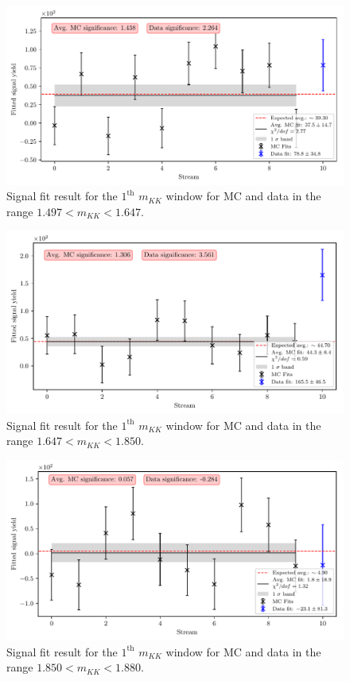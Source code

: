 \begin{figure}[H]
	\centering
	\captionsetup{width=0.8\linewidth}
	\includegraphics[width=\linewidth]{fig/sig_mKK_6}
	\caption{Signal fit result for the $1^{\mathrm{th}}$ $m_{KK}$ window for MC and data in the range $1.497  < m_{KK} < 1.647$.}
\end{figure}

\begin{figure}[H]
	\centering
	\captionsetup{width=0.8\linewidth}
	\includegraphics[width=\linewidth]{fig/sig_mKK_7}
	\caption{Signal fit result for the $1^{\mathrm{th}}$ $m_{KK}$ window for MC and data in the range $1.647  < m_{KK} < 1.850$.}
\end{figure}

\begin{figure}[H]
	\centering
	\captionsetup{width=0.8\linewidth}
	\includegraphics[width=\linewidth]{fig/sig_mKK_8}
	\caption{Signal fit result for the $1^{\mathrm{th}}$ $m_{KK}$ window for MC and data in the range $1.850  < m_{KK} < 1.880$.}
\end{figure}

